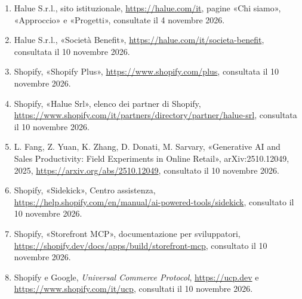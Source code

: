 
\label{cap:riferimenti}

\begin{enumerate}
        \item \label{rif:halue}Halue S.r.l., sito istituzionale, \url{https://halue.com/it}, pagine «Chi siamo»,
	«Approccio» e «Progetti», consultate il 4 novembre 2026.
	\item \label{rif:halue-benefit}Halue S.r.l., «Società Benefit», \url{https://halue.com/it/societa-benefit},
	consultata il 10 novembre 2026.
	\item \label{rif:shopify-plus}Shopify, «Shopify Plus», \url{https://www.shopify.com/plus}, consultata il
	10 novembre 2026.
	\item \label{rif:halue-partner}Shopify, «Halue Srl», elenco dei partner di Shopify,
	\url{https://www.shopify.com/it/partners/directory/partner/halue-srl}, consultata il 10 novembre 2026.
	\item \label{rif:studio-genai}L. Fang, Z. Yuan, K. Zhang, D. Donati, M. Sarvary, «Generative AI and
	Sales Productivity: Field Experiments in Online Retail», arXiv:2510.12049, 2025,
	\url{https://arxiv.org/abs/2510.12049}, consultato il 10 novembre 2026.
	\item \label{rif:sidekick}Shopify, «Sidekick», Centro assistenza,
	\url{https://help.shopify.com/en/manual/ai-powered-tools/sidekick}, consultato il 10 novembre 2026.
	\item \label{rif:storefront-mcp}Shopify, «Storefront MCP», documentazione per sviluppatori,
	\url{https://shopify.dev/docs/apps/build/storefront-mcp}, consultato il 10 novembre 2026.
	\item \label{rif:ucp}Shopify e Google, \emph{Universal Commerce Protocol},
	\url{https://ucp.dev} e \url{https://www.shopify.com/it/ucp}, consultati il 10 novembre 2026.
\end{enumerate}
